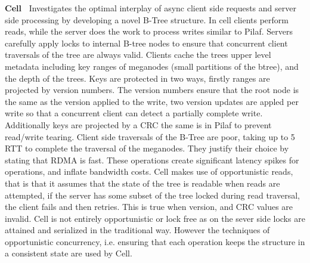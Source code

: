 \textbf{Cell~\cite{cell}} Investigates the optimal interplay of async client
side requests and server side processing by developing a novel B-Tree structure.
In cell clients perform reads, while the server does the work to process writes
similar to Pilaf.
%
Servers carefully apply locks to internal B-tree nodes to ensure that concurrent
client traversals of the tree are always valid. Clients cache the trees upper
level metadata including key ranges of meganodes (small partitions of the
btree), and the depth of the trees.
%
Keys are protected in two ways, firstly ranges are projected by version numbers.
The version numbers ensure that the root node is the same as the version applied
to the write, two version updates are appled per write so that a concurrent
client can detect a partially complete write. Additionally keys are projected by
a CRC the same is in Pilaf to prevent read/write tearing.
%
Client side traversals of the B-Tree are poor, taking up to 5 RTT to complete
the traversal of the meganodes. They justify their choice by stating that RDMA
is fast. These operations create significant latency spikes for operations, and
inflate bandwidth costs.
%
Cell makes use of opportunistic reads, that is that it assumes that the state of
the tree is readable when reads are attempted, if the server has some subset of
the tree locked during read traversal, the client fails and then retries. This
is true when version, and CRC values are invalid. Cell is not entirely
opportunistic or lock free as on the sever side locks are attained and
serialized in the traditional way. However the techniques of opportunistic
concurrency, i.e. ensuring that each operation keeps the structure in a
consistent state are used by Cell.






